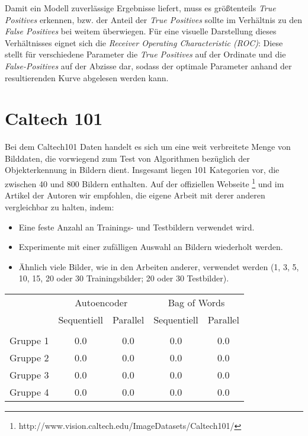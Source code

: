 Damit ein Modell zuverlässige Ergebnisse liefert, muss es größtenteils \textit{True Positives} erkennen, bzw. der Anteil der \textit{True Positives} sollte im Verhältnis zu den \textit{False Positives} bei weitem überwiegen. Für eine visuelle Darstellung dieses Verhältnisses eignet sich die \textit{Receiver Operating Characteristic (ROC)}: Diese stellt für verschiedene Parameter die \textit{True Positives} auf der Ordinate und die \textit{False-Positives} auf der Abzisse dar, sodass der optimale Parameter anhand der resultierenden Kurve abgelesen werden kann.

\section{Caltech 101}

Bei dem Caltech101 Daten handelt es sich um eine weit verbreitete Menge von Bilddaten, die vorwiegend zum Test von Algorithmen bezüglich der Objekterkennung in Bildern dient. Insgesamt liegen 101 Kategorien vor, die zwischen 40 und 800 Bildern enthalten. Auf der offiziellen Webseite \footnote{http://www.vision.caltech.edu/Image\textunderscore Datasets/Caltech101/} und im Artikel der Autoren wir empfohlen, die eigene Arbeit mit derer anderen vergleichbar zu halten, indem:

\begin{itemize}
	\item Eine feste Anzahl an Trainings- und Testbildern verwendet wird.
	\item Experimente mit einer zufälligen Auswahl an Bildern wiederholt werden.
	\item Ähnlich viele Bilder, wie in den Arbeiten anderer, verwendet werden (1, 3, 5, 10, 15, 20 oder 30 Trainingsbilder; 20 oder 30 Testbilder).
\end{itemize}

\begin{center}
    \begin{tabular}{l c c c c}
     		 & \multicolumn{2}{c}{Autoencoder} & \multicolumn{2}{c}{Bag of Words}  \\
    	     & Sequentiell & Parallel 	& Sequentiell  & Parallel  		\\ \hline
    	     															\\[-0.9em] 
    Gruppe 1 & 0.0		   & 0.0		& 0.0		   & 0.0			\\     
    Gruppe 2 & 0.0		   & 0.0		& 0.0		   & 0.0			\\ 
    Gruppe 3 & 0.0		   & 0.0	 	& 0.0		   & 0.0			\\ 
    Gruppe 4 & 0.0		   & 0.0		& 0.0		   & 0.0			\\
    \end{tabular}
\end{center}

